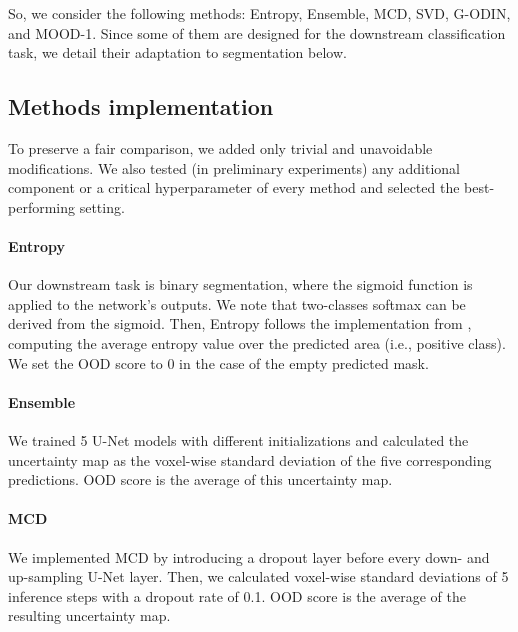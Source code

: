 So, we consider the following methods: Entropy, Ensemble, MCD, SVD, G-ODIN, and MOOD-1. Since some of them are designed for the downstream classification task, we detail their adaptation to segmentation below.


\subsection{Methods implementation}

To preserve a fair comparison, we added only trivial and unavoidable modifications. We also tested (in preliminary experiments) any additional component or a critical hyperparameter of every method and selected the best-performing setting.


\paragraph{Entropy}
Our downstream task is binary segmentation, where the sigmoid function is applied to the network's outputs. We note that two-classes softmax can be derived from the sigmoid. Then, Entropy follows the implementation from \cite{mehrtash2020confidence,karimi2022improving}, computing the average entropy value over the predicted area (i.e., positive class). We set the OOD score to 0 in the case of the empty predicted mask.

\paragraph{Ensemble}
We trained 5 U-Net models with different initializations and calculated the uncertainty map as the voxel-wise standard deviation of the five corresponding predictions. OOD score is the average of this uncertainty map.

\paragraph{MCD}
We implemented MCD by introducing a dropout layer before every down- and up-sampling U-Net layer. Then, we calculated voxel-wise standard deviations of 5 inference steps with a dropout rate of 0.1. OOD score is the average of the resulting uncertainty map.

